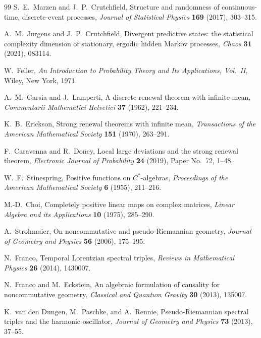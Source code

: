 \documentclass[11pt]{article}
\theoremstyle{definition}
\theoremstyle{remark}
\begin{document}
\begin{thebibliography}{99}
S.~E.~Marzen and J.~P.~Crutchfield,
\newblock Structure and randomness of continuous-time, discrete-event
processes,
\newblock \emph{Journal of Statistical Physics} \textbf{169} (2017),
303--315.

A.~M.~Jurgens and J.~P.~Crutchfield,
\newblock Divergent predictive states: the statistical complexity dimension
of stationary, ergodic hidden Markov processes,
\newblock \emph{Chaos} \textbf{31} (2021), 083114.

W.~Feller,
\newblock \emph{An Introduction to Probability Theory and Its Applications,
Vol.~II},
\newblock Wiley, New York, 1971.

A.~M.~Garsia and J.~Lamperti,
\newblock A discrete renewal theorem with infinite mean,
\newblock \emph{Commentarii Mathematici Helvetici} \textbf{37} (1962),
221--234.

K.~B.~Erickson,
\newblock Strong renewal theorems with infinite mean,
\newblock \emph{Transactions of the American Mathematical Society}
\textbf{151} (1970), 263--291.

F.~Caravenna and R.~Doney,
\newblock Local large deviations and the strong renewal theorem,
\newblock \emph{Electronic Journal of Probability} \textbf{24} (2019),
Paper No.~72, 1--48.

W.~F.~Stinespring,
\newblock Positive functions on $C^*$-algebras,
\newblock \emph{Proceedings of the American Mathematical Society}
\textbf{6} (1955), 211--216.

M.-D.~Choi,
\newblock Completely positive linear maps on complex matrices,
\newblock \emph{Linear Algebra and its Applications} \textbf{10} (1975),
285--290.

A.~Strohmaier,
\newblock On noncommutative and pseudo-Riemannian geometry,
\newblock \emph{Journal of Geometry and Physics} \textbf{56} (2006),
175--195.

N.~Franco,
\newblock Temporal Lorentzian spectral triples,
\newblock \emph{Reviews in Mathematical Physics} \textbf{26} (2014),
1430007.

N.~Franco and M.~Eckstein,
\newblock An algebraic formulation of causality for noncommutative geometry,
\newblock \emph{Classical and Quantum Gravity} \textbf{30} (2013), 135007.

K.~van den Dungen, M.~Paschke, and A.~Rennie,
\newblock Pseudo-Riemannian spectral triples and the harmonic oscillator,
\newblock \emph{Journal of Geometry and Physics} \textbf{73} (2013),
37--55.


\end{thebibliography}
\end{document}
